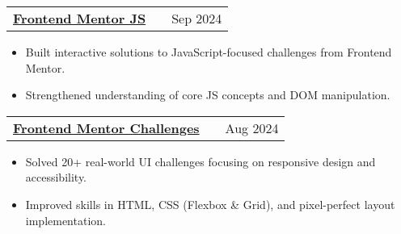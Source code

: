 \documentclass[a4paper,10pt]{article}
\makeatletter
\newenvironment{jobshort}[2]
    {
    \begin{tabularx}{\linewidth}{@{}l X r@{}}
    \textbf{#1} & \hfill &  #2 \\[3.75pt]
    \end{tabularx}
    }
    {
    }
\newenvironment{joblong}[2]
    {
    \begin{tabularx}{\linewidth}{@{}l X r@{}}
    \textbf{#1} & \hfill &  #2 \\[3.75pt]
    \end{tabularx}
    \begin{minipage}[t]{\linewidth}
    \begin{itemize}[nosep,after=\strut, leftmargin=1em, itemsep=3pt,label=--]
    }
    {
    \end{itemize}
    \end{minipage}    
    }
\makeatother
\begin{document}
    \begin{joblong}
        {\href{https://github.com/gauravgorane/Frontend_mentor_js}{Frontend Mentor JS \faExternalLink*} \normalfont{\textit{[JavaScript, DOM, Web Components]}}}{Sep 2024}
        \item Built interactive solutions to JavaScript-focused challenges from Frontend Mentor.
        \item Strengthened understanding of core JS concepts and DOM manipulation.
    \end{joblong}

    \begin{joblong}
        {\href{https://github.com/gauravgorane/Frontend_Mentor}{Frontend Mentor Challenges \faExternalLink*} \normalfont{\textit{[HTML, CSS, Responsive Design]}}}{Aug 2024}
        \item Solved 20+ real-world UI challenges focusing on responsive design and accessibility.
        \item Improved skills in HTML, CSS (Flexbox \& Grid), and pixel-perfect layout implementation. 
    \end{joblong}


    
\end{document}
